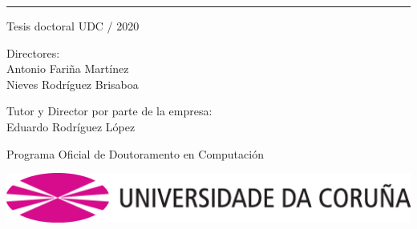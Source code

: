\begin{titlepage}


\vspace*{0.9cm}


\vspace*{1.5cm}



\noindent \textcolor{rosaudc}{\rule{\textwidth}{2mm}}

{\large
  \noindent Tesis doctoral UDC / 2020

  \vspace*{1.5cm}

  \noindent Directores: \\Antonio Fari\~na Mart\'inez \\ Nieves Rodr\'iguez Brisaboa
  
  \vspace*{1.0cm}
  
  \noindent Tutor y Director por parte de la empresa: \\Eduardo Rodr\'iguez L\'opez
  
  \vspace*{1.5cm}

  \noindent Programa Oficial de Doutoramento en Computaci\'on
}

\begin{center}
  \vspace*{1.9cm}
  \includegraphics[scale=0.20]{figures/_init/udc-color}
\end{center}


\end{titlepage}

\thispagestyle{empty}

